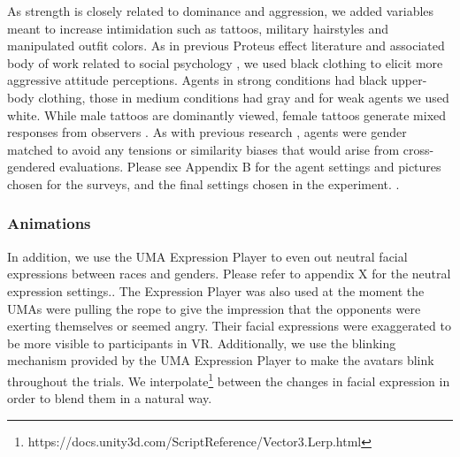 As strength is closely related to dominance and aggression, we added variables meant to increase intimidation such as tattoos, military hairstyles and manipulated outfit colors. As in previous Proteus effect literature and associated body of work related to social psychology \cite{yee2009proteus,pena2009priming}, we used black clothing to elicit more aggressive attitude perceptions. Agents in strong conditions had black upper-body clothing, those in medium conditions had gray and for weak agents we used white. While male tattoos are dominantly viewed, female tattoos generate mixed responses from observers \cite{wohlrab2009perception}. As with previous research \cite{van2013proteus}, agents were gender matched to avoid any tensions or similarity biases that would arise from cross-gendered evaluations. Please see Appendix B for the agent settings and pictures chosen for the surveys, and the final settings chosen in the experiment. .

\subsubsection{Animations}
\label{subsection:animation}
 In addition, we use the UMA Expression Player to even out neutral facial expressions between races and genders. Please refer to appendix X for the neutral expression settings.. The Expression Player was also used at the moment the UMAs were pulling the rope to give the impression that the opponents were exerting themselves or seemed angry. Their facial expressions were exaggerated to be more visible to participants in VR. Additionally, we use the blinking mechanism provided by the UMA Expression Player to make the avatars blink throughout the trials. We interpolate\footnote{https://docs.unity3d.com/ScriptReference/Vector3.Lerp.html} between the changes in facial expression in order to blend them in a natural way.
 
